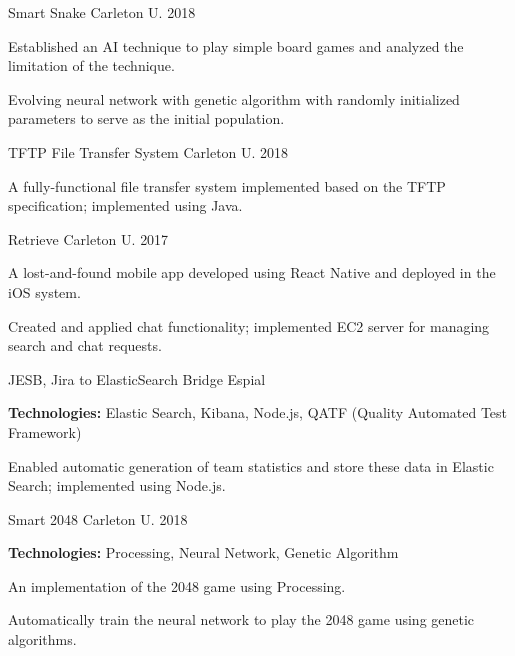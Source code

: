 \begin{cventries}

\cventry
{\textnormal{}}
{Smart Snake}
{Carleton U.}
{2018}
{\begin{cvitems}
    \item {Established an AI technique to play simple board games and analyzed the limitation of the technique.}
    \item {Evolving neural network with genetic algorithm with randomly initialized parameters to serve as the initial population.}
\end{cvitems}}

\cventry
{\textnormal{}}
{TFTP File Transfer System}
{Carleton U.}
{2018}
{\begin{cvitems}
    \item {A fully-functional file transfer system implemented based on the TFTP specification; implemented using Java.}
\end{cvitems}}

\cventry
{\textnormal{}}
{Retrieve}
{Carleton U.}
{2017}
{\begin{cvitems}
    \item {A lost-and-found mobile app developed using React Native and deployed in the iOS system.}
    \item {Created and applied chat functionality; implemented EC2 server for managing search and chat requests.}
\end{cvitems}}

\cvshortentry
{JESB, Jira to ElasticSearch Bridge}
{Espial}
{\begin{cvitems}
    \item {\textbf{Technologies:} Elastic Search, Kibana, Node.js, QATF (Quality Automated Test Framework)}
    \item {Enabled automatic generation of team statistics and store these data in Elastic Search; implemented using Node.js.}
\end{cvitems}}

\cventry
{\textnormal{}}
{Smart 2048}
{Carleton U.}
{2018}
{\begin{cvitems}
    \item {\textbf{Technologies:} Processing, Neural Network, Genetic Algorithm}
    \item {An implementation of the 2048 game using Processing.}
    \item {Automatically train the neural network to play the 2048 game using genetic algorithms.}
\end{cvitems}}


\end{cventries}
